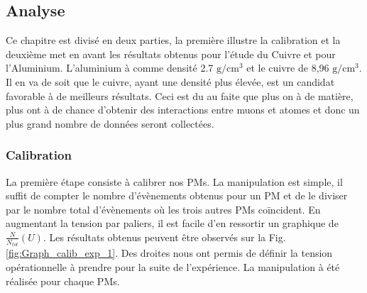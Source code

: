 \documentclass[12pt]{article}
\begin{document}
\subsection{Analyse}

Ce chapitre est divisé en deux parties, la première illustre la calibration et la deuxième met en avant les résultats obtenus pour l'étude du Cuivre et pour l'Aluminium. L'aluminium à comme densité 2.7 $\text{g}/\text{cm}^{3}$ et le cuivre de 8,96 $\text{g}/\text{cm}^{3}$. Il en va de soit que le cuivre, ayant une densité plus élevée, est un candidat favorable à de meilleurs résultats. Ceci est du au faite que plus on à de matière, plus ont à de chance d'obtenir des interactions entre muons et atomes et donc un plus grand nombre de données seront collectées. 

\subsubsection{Calibration}

La première étape consiste à calibrer nos PMs. La manipulation est simple, il suffit de compter le nombre d'évènements obtenus pour un PM et de le diviser par le nombre total d'évènements où les trois autres PMs coïncident. En augmentant la tension par paliers, il est facile d'en ressortir un graphique de $\frac{N}{N_{tot}}(U)$. Les résultats obtenus peuvent être observés sur la Fig. \ref{fig:Graph_calib_exp_1}. Des droites nous ont permis de définir la tension opérationnelle à prendre pour la suite de l'expérience. La manipulation à été réalisée pour chaque PMs.
\end{document}
